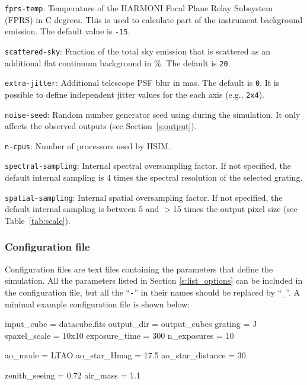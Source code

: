 \documentclass[12pt]{report}
\begin{document}
\begin{description}
\item \texttt{fprs-temp}: Temperature of the HARMONI Focal Plane Relay Subsystem (FPRS) in C degrees. This is used to calculate part of the instrument background emission. The default value is \texttt{-15}.

\item \texttt{scattered-sky}: Fraction of the total sky emission that is scattered as an additional flat continuum background in \%. The default is \texttt{20}.

\item \texttt{extra-jitter}: Additional telescope PSF blur in mas. The default is \texttt{0}. It is possible to define independent jitter values for the each axis (e.g., \texttt{2x4}).

\item \texttt{noise-seed}: Random number generator seed using during the simulation. It only affects the observed outputs (see Section~\ref{s:output}).

\item \texttt{n-cpus}: Number of processors used by HSIM.

\item \texttt{spectral-sampling}: Internal spectral oversampling factor. If not specified, the default internal sampling is 4 times the spectral resolution of the selected grating.

\item \texttt{spatial-sampling}: Internal spatial oversampling factor. If not specified, the default internal sampling is between 5 and $>$15 times the output pixel size (see Table~\ref{tab:scale}).

\end{description}

\subsubsection{Configuration file}\label{ss:conf_file}

Configuration files are text files containing the parameters that define the simulation. All the parameters listed in Section \ref{s:list_options} can be included in the configuration file, but all the ``\texttt{-}'' in their names should be replaced by ``\texttt{\_}''. A minimal example configuration file is shown below:

\begin{textfile}
[HSIM]
input_cube = datacube.fits
output_dir = output_cubes
grating = J
spaxel_scale = 10x10
exposure_time = 300
n_exposures = 10

ao_mode = LTAO
ao_star_Hmag = 17.5
ao_star_distance = 30

zenith_seeing = 0.72
air_mass = 1.1
\end{textfile}
\end{document}

